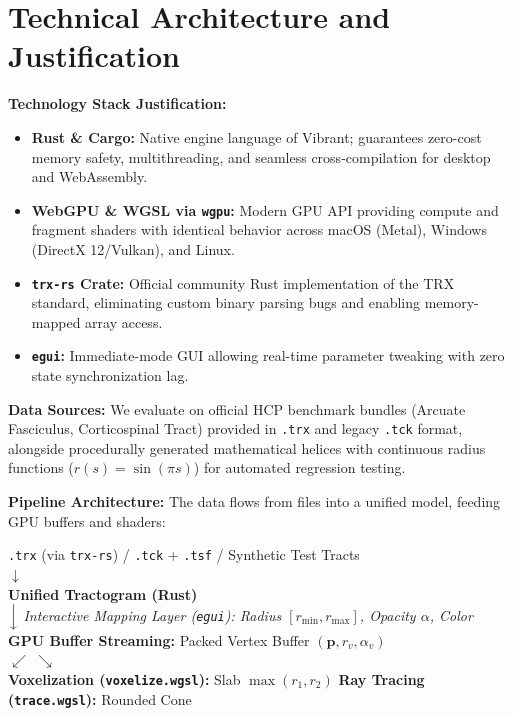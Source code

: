 \documentclass[10pt,a4paper]{article}
\begin{document}
\section{Technical Architecture and Justification}

\noindent \textbf{Technology Stack Justification:}
\begin{itemize}[leftmargin=*,nosep]
    \item \textbf{Rust \& Cargo:} Native engine language of Vibrant; guarantees zero-cost memory safety, multithreading, and seamless cross-compilation for desktop and WebAssembly.
    \item \textbf{WebGPU \& WGSL via \texttt{wgpu}:} Modern GPU API providing compute and fragment shaders with identical behavior across macOS (Metal), Windows (DirectX 12/Vulkan), and Linux.
    \item \textbf{\texttt{trx-rs} Crate:} Official community Rust implementation of the TRX standard, eliminating custom binary parsing bugs and enabling memory-mapped array access.
    \item \textbf{\texttt{egui}:} Immediate-mode GUI allowing real-time parameter tweaking with zero state synchronization lag.
\end{itemize}

\noindent \textbf{Data Sources:} We evaluate on official HCP benchmark bundles (Arcuate Fasciculus, Corticospinal Tract) provided in \texttt{.trx} and legacy \texttt{.tck} format, alongside procedurally generated mathematical helices with continuous radius functions ($r(s) = \sin(\pi s)$) for automated regression testing.

\vspace{0.1cm}
\noindent \textbf{Pipeline Architecture:} The data flows from files into a unified model, feeding GPU buffers and shaders:
\begin{center}
\small
\begin{tcolorbox}[colback=white,colframe=bordergray]
\centering
\texttt{.trx} (via \texttt{trx-rs}) \quad / \quad \texttt{.tck} + \texttt{.tsf} \quad / \quad Synthetic Test Tracts\\
$\downarrow$\\
\textbf{Unified Tractogram (Rust)}\\
$\Big\downarrow$ \emph{Interactive Mapping Layer (\texttt{egui}): Radius $[r_{\min}, r_{\max}]$, Opacity $\alpha$, Color}\\
\textbf{GPU Buffer Streaming:} Packed Vertex Buffer $(\mathbf{p}, r_v, \alpha_v)$\\
$\swarrow$ \hspace{4.2cm} $\searrow$\\
\textbf{Voxelization (\texttt{voxelize.wgsl}):} Slab $\max(r_1, r_2)$ \hspace{0.8cm} \textbf{Ray Tracing (\texttt{trace.wgsl}):} Rounded Cone
\end{tcolorbox}
\end{center}
\end{document}
